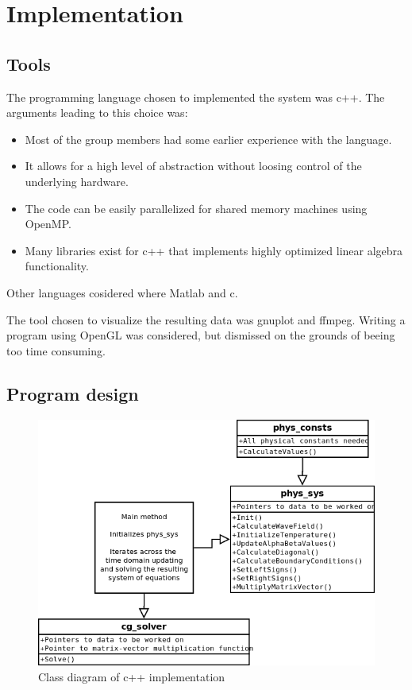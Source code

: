 
\chapter{Implementation}

\section{Tools}

The programming language chosen to implemented the system was c++.
The arguments leading to this choice was:

\begin{itemize}
\item Most of the group members had some earlier experience with the language.
\item It allows for a high level of abstraction without loosing control of the
underlying hardware.
\item The code can be easily parallelized for shared memory machines using OpenMP.
\item Many libraries exist for c++ that implements highly optimized linear algebra
functionality.
\end{itemize}

Other languages cosidered where Matlab and c.

The tool chosen to visualize the resulting data was gnuplot and ffmpeg. Writing a
program using OpenGL was considered, but dismissed on the grounds of beeing too time consuming.

\section{Program design}

\begin{figure}[!h]
  \begin{center}
    \includegraphics[width=0.5\linewidth]{classdiagram.png}
  \end{center}
  \caption{Class diagram of c++ implementation}
  \label{fig:classdiagram}
\end{figure}

